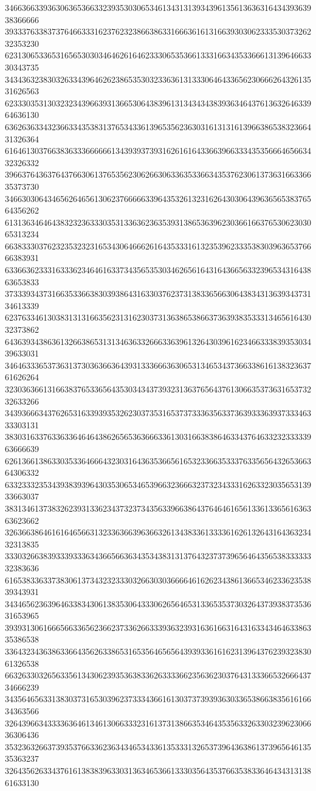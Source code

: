 34663663393630636536633239353030653461343131393439613561363631643439363938366666
39333763383737646633316237623238663863316663616131663930306233353037326232353230
62313065336531656530303464626164623330653536613331663435336661313964663330343735
34343632383032633439646262386535303233636131333064643365623066626432613531626563
62333035313032323439663931366530643839613134343438393634643761363264633964636130
63626363343236633435383137653433613965356236303161313161396638653832366431326364
61646130376638363336666661343939373931626161643366396633343535666465663432326332
39663764363764376630613765356230626630633635336634353762306137363166336635373730
34663030643465626465613062376666633964353261323162643030643963656538376564356262
61313634646438323236333035313363623635393138653639623036616637653062303065313234
66383330376232353232316534306466626164353331613235396233353830396365376666383931
63366362333163336234646163373435653530346265616431643665633239653431643863653833
37333934373166353366383039386431633037623731383365663064383431363934373134613339
62376334613038313131663562313162303731363865386637363938353331346561643032373862
64363934386361326638653131346363326663363961326430396162346633383935303439633031
34646333653736313730363663643931333666363065313465343736633861613832363761626264
32303636613166383765336564353034343739323136376564376130663537363165373232633266
34393666343762653163393935326230373531653737333635633736393336393733346333303131
38303163376336336464643862656536366633613031663838646334376463323233333963666639
62613661386330353364666432303164363536656165323366353337633565643265366364306332
63323332353439383939643035306534653966323666323732343331626332303565313933663037
38313461373832623931336234373237343563396638643764646165613361336561636363623662
32636638646161646566313233636639636632613438336133336162613264316436323432313835
33303266383933393336343665663634353438313137643237373965646435653833333332383636
61653833633738306137343232333032663030366664616262343861366534623362353839343931
34346562363964633834306138353064333062656465313365353730326437393837353631653965
39393130616665663365623662373362663339363239316361663164316334346463386335386538
33643234363863366435626338653165356465656439393361616231396437623932383061326538
66326330326563356134306239353638336263333662356362303764313336653266643734666239
34356465633138303731653039623733343661613037373939363033653866383561616634363566
32643966343333636461346130663332316137313866353464353563326330323962306636306436
35323632663739353766336236343465343361353331326537396436386137396564613535363237
32643562633437616138383963303136346536613330356435376635383364643431313861633130
